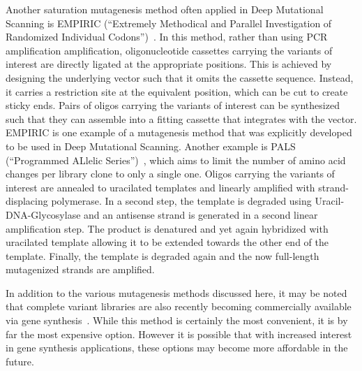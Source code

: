 Another saturation mutagenesis method often applied in Deep Mutational Scanning is EMPIRIC (``Extremely Methodical and Parallel Investigation of Randomized Individual Codons'')~\cite{hietpas_experimental_2011}. In this method, rather than using PCR amplification amplification, oligonucleotide cassettes carrying the variants of interest are directly ligated at the appropriate positions. This is achieved by designing the underlying vector such that it omits the cassette sequence. Instead, it carries a restriction site at the equivalent position, which can be cut to create sticky ends. Pairs of oligos carrying the variants of interest can be synthesized such that they can assemble into a fitting cassette that integrates with the vector.
EMPIRIC is one example of a mutagenesis method that was explicitly developed to be used in Deep Mutational Scanning. Another example is PALS (``Programmed ALlelic Series'')~\cite{kitzman_massively_2015}, which aims to limit the number of amino acid changes per library clone to only a single one. Oligos carrying the variants of interest are annealed to uracilated templates and linearly amplified with strand-displacing polymerase. In a second step, the template is degraded using Uracil-DNA-Glycosylase and an antisense strand is generated in a second linear amplification step. The product is denatured and yet again hybridized with uracilated template allowing it to be extended towards the other end of the template. Finally, the template is degraded again and the now full-length mutagenized strands are amplified.

In addition to the various mutagenesis methods discussed here, it may be noted that complete variant libraries are also recently becoming commercially available via gene synthesis~\cite{kosuri_scalable_2010}. While this method is certainly the most convenient, it is by far the most expensive option. However it is possible that with increased interest in gene synthesis applications, these options may become more affordable in the future.



